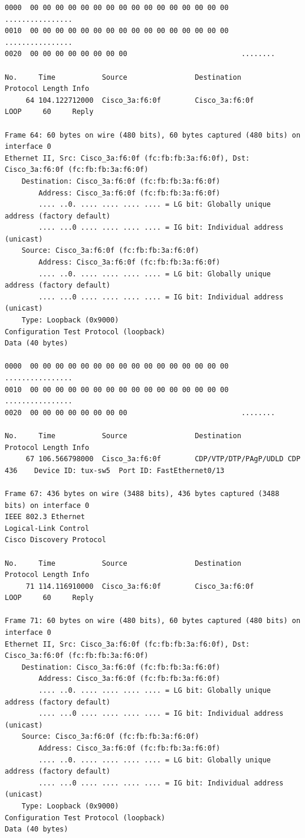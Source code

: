 \documentclass[a4paper,11pt]{article}
\begin{document}
\begin{lstlisting}
0000  00 00 00 00 00 00 00 00 00 00 00 00 00 00 00 00   ................
0010  00 00 00 00 00 00 00 00 00 00 00 00 00 00 00 00   ................
0020  00 00 00 00 00 00 00 00                           ........

No.     Time           Source                Destination           Protocol Length Info
     64 104.122712000  Cisco_3a:f6:0f        Cisco_3a:f6:0f        LOOP     60     Reply

Frame 64: 60 bytes on wire (480 bits), 60 bytes captured (480 bits) on interface 0
Ethernet II, Src: Cisco_3a:f6:0f (fc:fb:fb:3a:f6:0f), Dst: Cisco_3a:f6:0f (fc:fb:fb:3a:f6:0f)
    Destination: Cisco_3a:f6:0f (fc:fb:fb:3a:f6:0f)
        Address: Cisco_3a:f6:0f (fc:fb:fb:3a:f6:0f)
        .... ..0. .... .... .... .... = LG bit: Globally unique address (factory default)
        .... ...0 .... .... .... .... = IG bit: Individual address (unicast)
    Source: Cisco_3a:f6:0f (fc:fb:fb:3a:f6:0f)
        Address: Cisco_3a:f6:0f (fc:fb:fb:3a:f6:0f)
        .... ..0. .... .... .... .... = LG bit: Globally unique address (factory default)
        .... ...0 .... .... .... .... = IG bit: Individual address (unicast)
    Type: Loopback (0x9000)
Configuration Test Protocol (loopback)
Data (40 bytes)

0000  00 00 00 00 00 00 00 00 00 00 00 00 00 00 00 00   ................
0010  00 00 00 00 00 00 00 00 00 00 00 00 00 00 00 00   ................
0020  00 00 00 00 00 00 00 00                           ........

No.     Time           Source                Destination           Protocol Length Info
     67 106.566798000  Cisco_3a:f6:0f        CDP/VTP/DTP/PAgP/UDLD CDP      436    Device ID: tux-sw5  Port ID: FastEthernet0/13  

Frame 67: 436 bytes on wire (3488 bits), 436 bytes captured (3488 bits) on interface 0
IEEE 802.3 Ethernet 
Logical-Link Control
Cisco Discovery Protocol

No.     Time           Source                Destination           Protocol Length Info
     71 114.116910000  Cisco_3a:f6:0f        Cisco_3a:f6:0f        LOOP     60     Reply

Frame 71: 60 bytes on wire (480 bits), 60 bytes captured (480 bits) on interface 0
Ethernet II, Src: Cisco_3a:f6:0f (fc:fb:fb:3a:f6:0f), Dst: Cisco_3a:f6:0f (fc:fb:fb:3a:f6:0f)
    Destination: Cisco_3a:f6:0f (fc:fb:fb:3a:f6:0f)
        Address: Cisco_3a:f6:0f (fc:fb:fb:3a:f6:0f)
        .... ..0. .... .... .... .... = LG bit: Globally unique address (factory default)
        .... ...0 .... .... .... .... = IG bit: Individual address (unicast)
    Source: Cisco_3a:f6:0f (fc:fb:fb:3a:f6:0f)
        Address: Cisco_3a:f6:0f (fc:fb:fb:3a:f6:0f)
        .... ..0. .... .... .... .... = LG bit: Globally unique address (factory default)
        .... ...0 .... .... .... .... = IG bit: Individual address (unicast)
    Type: Loopback (0x9000)
Configuration Test Protocol (loopback)
Data (40 bytes)


\end{lstlisting}
\end{document}
